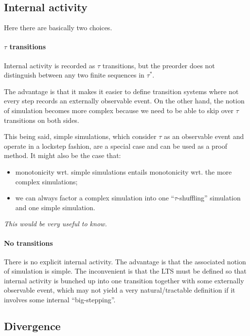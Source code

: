 \documentclass[11pt]{article}
\begin{document}

\subsection{Internal activity} %

Here there are basically two choices.

\paragraph{$\tau$ transitions}

Internal activity is recorded as $\tau$ transitions,
but the preorder does not distinguish
between any two finite sequences in $\tau^*$.

The advantage is that it makes it easier to define
transition systems where not every step
records an externally observable event.
On the other hand,
the notion of simulation becomes more complex
because we need to be able to skip over
$\tau$ transitions on both sides.

This being said, simple simulations,
which consider $\tau$ as an observable event
and operate in a lockstep fashion,
are a special case and can be used as a proof method.
It might also be the case that:
\begin{itemize}
  \item monotonicity wrt. simple simulations
    entails monotonicity wrt. the more complex simulations;
  \item we can always factor a complex simulation into
    one ``$\tau$-shuffling'' simulation and
    one simple simulation.
\end{itemize}
\emph{This would be very useful to know.}

\paragraph{No transitions}

There is no explicit internal activity.
The advantage is that
the associated notion of simulation is simple.
The inconvenient is that
the LTS must be defined so that
internal activity is bunched up into one transition
together with some externally observable event,
which may not yield a very natural/tractable definition
if it involves some internal ``big-stepping''.


\subsection{Divergence} %
\end{document}
